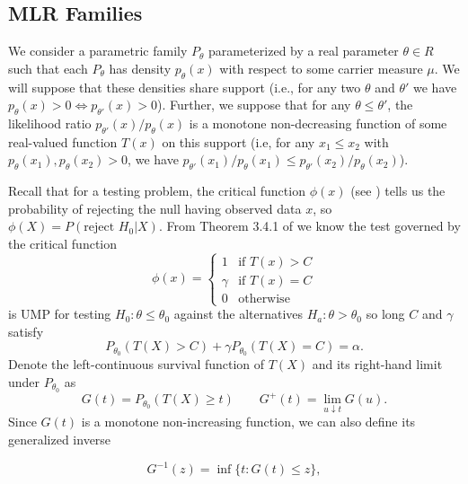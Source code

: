 \documentclass{article}
\begin{document}
\begin{appendix}
\subsection{MLR Families}
\label{sec:one_sided_mlr_appdx}

We consider a parametric family $P_{\theta}$ parameterized by a real parameter $\theta \in R$ such that each $P_{\theta}$ has density $p_{\theta}(x)$ with respect to some carrier measure $\mu$. We will suppose that these densities share support (i.e., for any two $\theta$ and $\theta'$ we have $p_{\theta}(x) > 0 \iff p_{\theta'}(x)> 0$). Further, we suppose that for any $\theta \leq \theta'$, the likelihood ratio $p_{\theta'}(x)/p_{\theta}(x)$ is a monotone non-decreasing function of some real-valued function $T(x)$ on this support (i.e, for any $x_1 \leq x_2$ with $p_{\theta}(x_1), p_{\theta}(x_2) > 0$, we have $p_{\theta'}(x_1)/p_{\theta}(x_1) \leq p_{\theta'}(x_2)/p_{\theta}(x_2)$). 

Recall that for a testing problem, the critical function $\phi(x)$ (see \cite[Section 3.1]{Lehmann}) tells us the probability of rejecting the null having observed data $x$, so $\phi(X) = P(\text{reject } H_0 | X)$. From Theorem 3.4.1 of \cite{Lehmann} we know the test governed by the critical function 
\begin{equation}
    \label{eq:mlr_test}
    \phi(x) = \begin{cases}
        1 &\text{if } T(x) > C  \\
        \gamma &\text{if } T(x) = C  \\
        0 & \text{otherwise }
    \end{cases}
\end{equation}
is UMP for testing $H_0 : \theta \leq \theta_0$ against the alternatives $H_a : \theta > \theta_0 $ so long $C$ and $\gamma$ satisfy
\begin{equation}
    \label{eq:constraint}
    P_{\theta_0}(T(X) > C) + \gamma P_{\theta_0}(T(X) = C) = \alpha.
\end{equation}
Denote the left-continuous survival function of $T(X)$ and its right-hand limit under $P_{\theta_0}$ as
\begin{equation*}
    G(t) = P_{\theta_0}(T(X) \geq t) \qquad G^+(t) = \lim_{u \downarrow t} G(u).
\end{equation*}
Since $G(t)$ is a monotone non-increasing function, we can also define its generalized inverse 

\begin{equation*}
    G^{-1}(z) = \inf \{ t : G(t) \leq z\},
\end{equation*}


\end{appendix}
\end{document}
